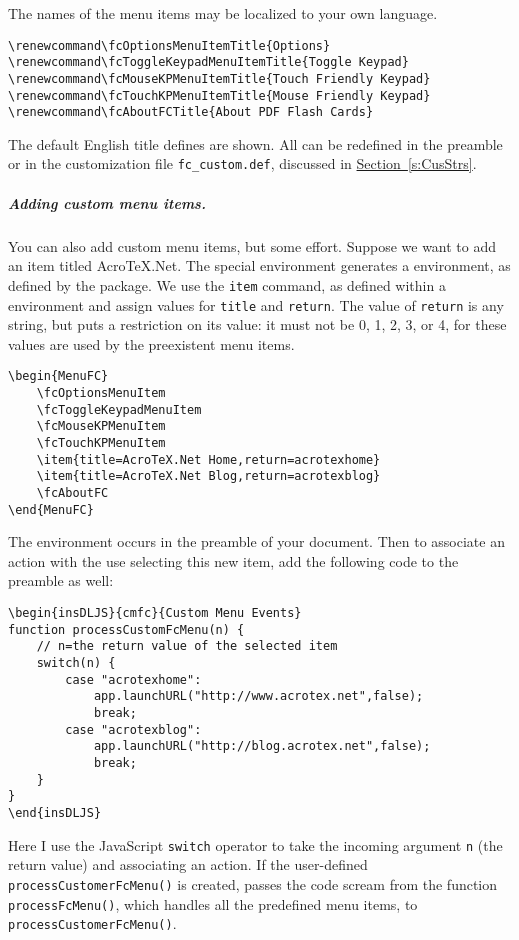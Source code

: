 \documentclass{article}
\makeatletter
\let\uif\textsf
\let\bslash=\@backslashchar
\def\cs#1{\texttt{\bslash#1}}
\makeatother
\begin{document}
The names of the menu items may be localized to your own language.
\begin{Verbatim}[xleftmargin=\amtIndent]
\renewcommand\fcOptionsMenuItemTitle{Options}
\renewcommand\fcToggleKeypadMenuItemTitle{Toggle Keypad}
\renewcommand\fcMouseKPMenuItemTitle{Touch Friendly Keypad}
\renewcommand\fcTouchKPMenuItemTitle{Mouse Friendly Keypad}
\renewcommand\fcAboutFCTitle{About PDF Flash Cards}
\end{Verbatim}
The default English title defines are shown. All can be redefined in the preamble or in the
customization file \texttt{fc\_custom.def}, discussed in \hyperref[s:CusStrs]{Section~\ref*{s:CusStrs}}.

\subparagraph*{Adding custom menu items.} You can also add custom menu items,
but some effort. Suppose we want to add an item titled \uif{AcroTeX.Net}. The
special environment generates a  environment, as defined by
the  package. We use the \cs{item} command, as defined within
a  environment and assign values for \texttt{title} and
\texttt{return}. The value of \texttt{return} is any string, but
 puts a restriction on its value: it must not be 0, 1, 2, 3,
or 4, for these values are used by the preexistent menu items.
\begin{Verbatim}[xleftmargin=\amtIndent]
\begin{MenuFC}
    \fcOptionsMenuItem
    \fcToggleKeypadMenuItem
    \fcMouseKPMenuItem
    \fcTouchKPMenuItem
    \item{title=AcroTeX.Net Home,return=acrotexhome}
    \item{title=AcroTeX.Net Blog,return=acrotexblog}
    \fcAboutFC
\end{MenuFC}
\end{Verbatim}
The  environment occurs in the preamble of your document. Then to associate an action
with the use selecting this new item, add the following code to the preamble as well:
\begin{Verbatim}[xleftmargin=\amtIndent]
\begin{insDLJS}{cmfc}{Custom Menu Events}
function processCustomFcMenu(n) {
    // n=the return value of the selected item
    switch(n) {
        case "acrotexhome":
            app.launchURL("http://www.acrotex.net",false);
            break;
        case "acrotexblog":
            app.launchURL("http://blog.acrotex.net",false);
            break;
    }
}
\end{insDLJS}
\end{Verbatim}
Here I use the JavaScript \texttt{switch} operator to take the incoming
argument \texttt{n} (the return value) and associating an action. If the
user-defined \texttt{processCustomerFcMenu()} is created, 
passes the code scream from the function \texttt{processFcMenu()}, which
handles all the predefined menu items, to \texttt{processCustomerFcMenu()}.
\end{document}
